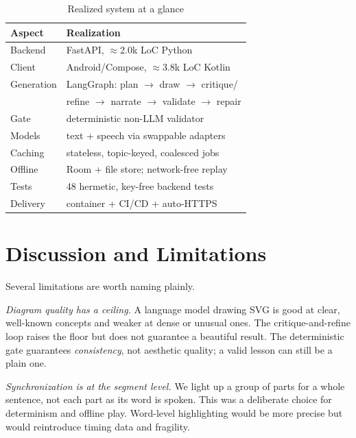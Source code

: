 \documentclass[conference]{IEEEtran}
\begin{document}
\begin{table}[t]
\caption{Realized system at a glance}
\label{tab:summary}
\centering
\renewcommand{\arraystretch}{1.2}
\begin{tabular}{@{}ll@{}}
\toprule
\textbf{Aspect} & \textbf{Realization} \\
\midrule
Backend & FastAPI, $\approx$2.0k LoC Python \\
Client & Android/Compose, $\approx$3.8k LoC Kotlin \\
Generation & LangGraph: plan $\to$ draw $\to$ critique/ \\
           & refine $\to$ narrate $\to$ validate $\to$ repair \\
Gate & deterministic non-LLM validator \\
Models & text + speech via swappable adapters \\
Caching & stateless, topic-keyed, coalesced jobs \\
Offline & Room + file store; network-free replay \\
Tests & 48 hermetic, key-free backend tests \\
Delivery & container + CI/CD + auto-HTTPS \\
\bottomrule
\end{tabular}
\end{table}

\section{Discussion and Limitations}
\label{sec:discussion}

Several limitations are worth naming plainly.

\emph{Diagram quality has a ceiling.} A language model drawing SVG is good at
clear, well-known concepts and weaker at dense or unusual ones. The
critique-and-refine loop raises the floor but does not guarantee a beautiful
result. The deterministic gate guarantees \emph{consistency}, not aesthetic
quality; a valid lesson can still be a plain one.

\emph{Synchronization is at the segment level.} We light up a group of parts for
a whole sentence, not each part as its word is spoken. This was a deliberate
choice for determinism and offline play. Word-level highlighting would be more
precise but would reintroduce timing data and fragility.
\end{document}
